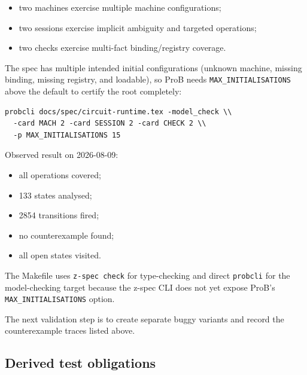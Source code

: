 \documentclass[a4paper,10pt,fleqn]{article}
\begin{document}
\begin{itemize}
  \item two machines exercise multiple machine configurations;
  \item two sessions exercise implicit ambiguity and targeted operations;
  \item two checks exercise multi-fact binding/registry coverage.
\end{itemize}

The spec has multiple intended initial configurations (unknown machine, missing
binding, missing registry, and loadable), so ProB needs
\texttt{MAX\_INITIALISATIONS} above the default to certify the root completely:

\begin{verbatim}
probcli docs/spec/circuit-runtime.tex -model_check \\
  -card MACH 2 -card SESSION 2 -card CHECK 2 \\
  -p MAX_INITIALISATIONS 15
\end{verbatim}

Observed result on 2026-08-09:

\begin{itemize}
  \item all operations covered;
  \item 133 states analysed;
  \item 2854 transitions fired;
  \item no counterexample found;
  \item all open states visited.
\end{itemize}

The Makefile uses \texttt{z-spec check} for type-checking and direct
\texttt{probcli} for the model-checking target because the z-spec CLI does not
yet expose ProB's \texttt{MAX\_INITIALISATIONS} option.

The next validation step is to create separate buggy variants and record the
counterexample traces listed above.

\subsection{Derived test obligations}
\end{document}
